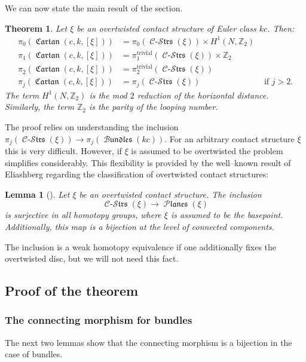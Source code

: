 \documentclass[10pt]{amsart}
\newcommand{\trivial}{{\operatorname{trivial}}}
\newcommand{\Cartan}{\operatorname{\mathfrak{Cartan}}}
\newcommand{\Cont}{\operatorname{\mathcal{C}-\mathcal{S}\mathfrak{trs}}}
\newcommand{\Planes}{\operatorname{\mathcal{P}\mathfrak{lanes}}}
\newcommand{\Bundles}{\operatorname{\mathcal{B}\mathfrak{undles}}}
\newcommand{\Z}{{\mathbb{Z}}}
\newtheorem{lemma}{Lemma}
\newtheorem{theorem}{Theorem}
\theoremstyle{definition}
\begin{document}
We can now state the main result of the section.
\begin{theorem} \label{thm:ot}
Let $\xi$ be an overtwisted contact structure of Euler class $kc$. Then:
\begin{align*}
\pi_0(\Cartan(c,k,[\xi])) &= \pi_0(\Cont(\xi)) \times H^1(N,\Z_2) & \\
\pi_1(\Cartan(c,k,[\xi])) &= \pi_1^\trivial(\Cont(\xi)) \times \Z_2 & \\
\pi_2(\Cartan(c,k,[\xi])) &= \pi_2^\trivial(\Cont(\xi)) & \\
\pi_j(\Cartan(c,k,[\xi])) &= \pi_j(\Cont(\xi)) & \text{ if } j>2.
\end{align*}
The term $H^1(N,\Z_2)$ is the mod $2$ reduction of the horizontal distance. Similarly, the term $\Z_2$ is the parity of the looping number.
\end{theorem}

The proof relies on understanding the inclusion $\pi_j(\Cont(\xi)) \to \pi_j(\Bundles(kc))$. For an arbitrary contact structure $\xi$ this is very difficult. However, if $\xi$ is assumed to be overtwisted the problem simplifies considerably. This flexibility is provided by the well--known result of Eliashberg regarding the classification of overtwisted contact structures:
\begin{lemma}[\cite{El}] \label{lem:Eliashberg}
Let $\xi$ be an overtwisted contact structure. The inclusion
\[ \Cont(\xi) \to \Planes(\xi) \]
is surjective in all homotopy groups, where $\xi$ is assumed to be the basepoint. Additionally, this map is a bijection at the level of connected components. 
\end{lemma}
The inclusion is a weak homotopy equivalence if one additionally fixes the overtwisted disc, but we will not need this fact.



\subsection{Proof of the theorem}

\subsubsection{The connecting morphism for bundles}

The next two lemmas show that the connecting morphism is a bijection in the case of bundles. 
\end{document}
